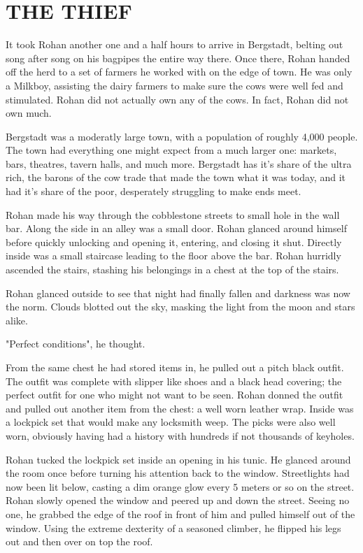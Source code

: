 \documentclass[ms,a4paper]{memoir}
\newcommand{\RED}[1]{\textcolor{red!50!black}{\MakeUppercase{#1}}}
\begin{document}
\chapter{\RED{The Thief}}

It took Rohan another one and a half hours to arrive in Bergstadt, belting out 
song after song on his bagpipes the entire way there. Once there, Rohan handed off the herd to 
a set of farmers he worked with on the edge of town. He was only a Milkboy, assisting 
the dairy farmers to make sure the cows were well fed and stimulated. Rohan did 
not actually own any of the cows. In fact, Rohan did not own much.

Bergstadt was a moderatly large town, with a population of roughly 4,000 people. The town 
had everything one might expect from a much larger one: markets, bars, theatres, tavern halls,
and much more. Bergstadt has it's share of the ultra rich, the barons of the cow trade that 
made the town what it was today, and it had it's share of the poor, desperately struggling 
to make ends meet.

Rohan made his way through the cobblestone streets to small hole in the wall bar. Along the side 
in an alley was a small door. Rohan glanced around himself before quickly unlocking and opening it, entering,
and closing it shut. Directly inside was a small staircase leading to the floor above
the bar. Rohan hurridly ascended the stairs, stashing his belongings in a chest at 
the top of the stairs.

Rohan glanced outside to see that night had finally fallen and darkness was now the 
norm. Clouds blotted out the sky, masking the light from the moon and stars alike.

"Perfect conditions", he thought.

From the same chest he had stored items in, he pulled out a pitch black outfit. The outfit
was complete with slipper like shoes and a black head covering; the perfect outfit 
for one who might not want to be seen. Rohan donned the outfit and pulled out another 
item from the chest: a well worn leather wrap. Inside was a lockpick set that would 
make any locksmith weep. The picks were also well worn, obviously having had a history 
with hundreds if not thousands of keyholes.

Rohan tucked the lockpick set inside an opening in his tunic. He glanced around the 
room once before turning his attention back to the window. Streetlights had now been 
lit below, casting a dim orange glow every 5 meters or so on the street. Rohan slowly 
opened the window and peered up and down the street. Seeing no one, he grabbed the 
edge of the roof in front of him and pulled himself out of the window. Using the extreme
dexterity of a seasoned climber, he flipped his legs out and then over on top the roof.
\end{document}
